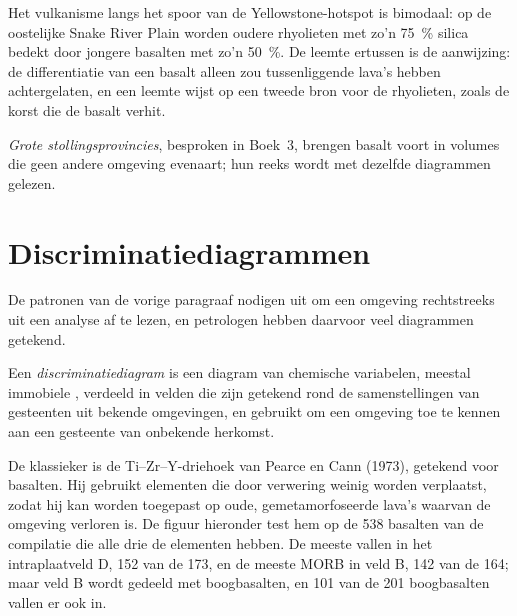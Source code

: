 Het vulkanisme langs het spoor van de Yellowstone-hotspot is bimodaal: op de oostelijke
Snake River Plain worden oudere rhyolieten met zo'n \qty{75}{\percent} silica bedekt door
jongere basalten met zo'n \qty{50}{\percent}. De leemte ertussen is de aanwijzing: de
differentiatie van een basalt alleen zou tussenliggende lava's hebben achtergelaten, en een leemte
wijst op een tweede bron voor de rhyolieten, zoals de korst die de basalt verhit.

\emph{Grote stollingsprovincies}, besproken in Boek~3, brengen basalt voort in volumes
die geen andere omgeving evenaart; hun reeks wordt met dezelfde diagrammen gelezen.

\section{Discriminatiediagrammen}\label{sec:b2:magmatic-series:discrimination}

De patronen van de vorige paragraaf nodigen uit om een omgeving rechtstreeks uit een analyse af te lezen,
en petrologen hebben daarvoor veel diagrammen getekend.

\begin{definition}[Discriminatiediagram]\label{def:b2:magmatic-series:discrimination}
Een \emph{discriminatiediagram} is een diagram van
chemische variabelen, meestal immobiele , verdeeld in velden die zijn getekend
rond de samenstellingen van gesteenten uit bekende omgevingen, en gebruikt om een omgeving toe te kennen aan een
gesteente van onbekende herkomst.
\end{definition}

De klassieker is de Ti--Zr--Y-driehoek van Pearce en Cann (1973), getekend voor basalten. Hij
gebruikt elementen die door verwering weinig worden verplaatst, zodat hij kan worden toegepast op oude,
gemetamorfoseerde lava's waarvan de omgeving verloren is. De figuur hieronder test hem op de 538 basalten van de
compilatie die alle drie de elementen hebben. De meeste  vallen in het
intraplaatveld D, 152 van de 173, en de meeste MORB in veld B, 142 van de 164; maar veld B wordt
gedeeld met boogbasalten, en 101 van de 201 boogbasalten vallen er ook in.

